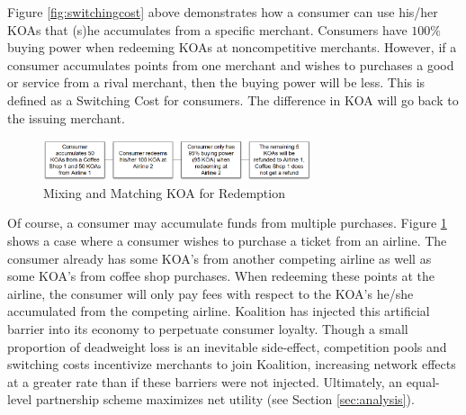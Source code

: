 Figure \ref{fig:switchingcost} above demonstrates how a consumer can use his/her KOAs that (s)he accumulates from a specific merchant. Consumers have $100\%$ buying power when redeeming KOAs at noncompetitive merchants. However, if a consumer accumulates points from one merchant and wishes to purchases a good or service from a rival merchant, then the buying power will be less. This is defined as a Switching Cost for consumers. The difference in KOA will go back to the issuing merchant. 
%
\begin{figure}[h] %
    \centering
        \includegraphics[keepaspectratio, width=0.7\textwidth]{images/redemption.png}
    \caption{Mixing and Matching KOA for Redemption} \label{fig:redemption}
\end{figure}

Of course, a consumer may accumulate funds from multiple purchases. Figure \ref{fig:redemption} shows a case where a consumer wishes to purchase a ticket from an airline. The consumer already has some KOA's from another competing airline as well as some KOA's from coffee shop purchases. When redeeming these points at the airline, the consumer will only pay fees with respect to the KOA's he/she accumulated from the competing airline. Koalition has injected this artificial barrier into its economy to perpetuate consumer loyalty. Though a small proportion of deadweight loss is an inevitable side-effect, competition pools and switching costs incentivize merchants to join Koalition, increasing network effects at a greater rate than if these barriers were not injected. Ultimately, an equal-level partnership scheme maximizes net utility (see Section \ref{sec:analysis}).

